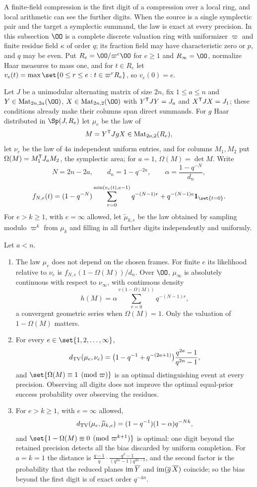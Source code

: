 A finite-field compression is the first digit of a compression over a local ring, and local
arithmetic can see the further digits. When the source is a single symplectic pair and the target
a symplectic summand, the law is exact at every precision. In this subsection $\OO$ is a complete
discrete valuation ring with uniformizer $\varpi$ and finite residue field $\kappa$ of order $q$; its
fraction field may have characteristic zero or $p$, and $q$ may be even. Put
$R_e=\OO/\varpi^e\OO$ for $e\ge1$ and $R_\infty=\OO$, normalize Haar measures to mass one, and
for $t\in R_e$ let $v_e(t)=\max\set{0\le r\le e:t\in\varpi^rR_e}$, so $v_e(0)=e$.

Let $J$ be a unimodular alternating matrix of size $2n$, fix $1\le a\le n$ and
$Y\in\spnMat_{2n,2a}(\OO)$, $X\in\spnMat_{2n,2}(\OO)$ with $Y^{\mathsf{T}}JY=J_a$ and
$X^{\mathsf{T}}JX=J_1$; these conditions already make their columns span direct summands. For $g$
Haar distributed in $\Sp(J,R_e)$ let $\mu_e$ be the law of
\[
 M=Y^{\mathsf{T}}JgX\in\operatorname{Mat}_{2a,2}(R_e),
\]
let $\nu_e$ be the law of $4a$ independent uniform entries, and for columns $M_1,M_2$ put
$\Omega(M)=M_1^{\mathsf{T}}J_aM_2$, the symplectic area; for $a=1$, $\Omega(M)=\det M$. Write
\[
 N=2n-2a,\qquad d_n=1-q^{-2n},\qquad \alpha=\frac{1-q^{-N}}{d_n},
\]
\[
 f_{N,e}(t)=(1-q^{-N})\sum_{r=0}^{\min(v_e(t),e-1)}q^{-(N-1)r}+q^{-(N-1)e}\mathbf 1_{\set{t=0}} .
\]
For $e>k\ge1$, with $e=\infty$ allowed, let $\widetilde\mu_{k,e}$ be the law obtained by sampling
modulo $\varpi^k$ from $\mu_k$ and filling in all further digits independently and uniformly.

\begin{theorem}\label{spn:thm:padic}
Let $a<n$.
\begin{enumerate}
\item The law $\mu_e$ does not depend on the chosen frames. For finite $e$ its likelihood
relative to $\nu_e$ is $f_{N,e}(1-\Omega(M))/d_n$. Over $\OO$, $\mu_\infty$ is absolutely
continuous with respect to $\nu_\infty$, with continuous density
\[
 h(M)=\alpha\sum_{r=0}^{v(1-\Omega(M))}q^{-(N-1)r},
\]
a convergent geometric series when $\Omega(M)=1$. Only the valuation of $1-\Omega(M)$ matters.
\item For every $e\in\set{1,2,\dots,\infty}$,
\[
 d_{\mathrm{TV}}(\mu_e,\nu_e)=\bigl(1-q^{-1}+q^{-(2a+1)}\bigr)\frac{q^{2a}-1}{q^{2n}-1},
\]
and $\set{\Omega(M)\equiv1\pmod\varpi}$ is an optimal distinguishing event at every precision.
Observing all digits does not improve the optimal equal-prior success probability over
observing the residues.
\item For $e>k\ge1$, with $e=\infty$ allowed,
\[
 d_{\mathrm{TV}}(\mu_e,\widetilde\mu_{k,e})=(1-q^{-1})(1-\alpha)q^{-Nk},
\]
and $\set{1-\Omega(M)\equiv0\pmod{\varpi^{k+1}}}$ is optimal: one digit beyond the retained
precision detects all the bias discarded by uniform completion. For $a=k=1$ the distance is
$\frac{q-1}q\cdot\frac{q^2-1}{(q^{2n}-1)q^{2n-2}}$, and the second factor is the probability that
the reduced planes $\operatorname{im}\overline Y$ and $\operatorname{im}(\overline g\,\overline X)$ coincide; so the
bias beyond the first digit is of exact order $q^{-4n}$.
\end{enumerate}
\end{theorem}

